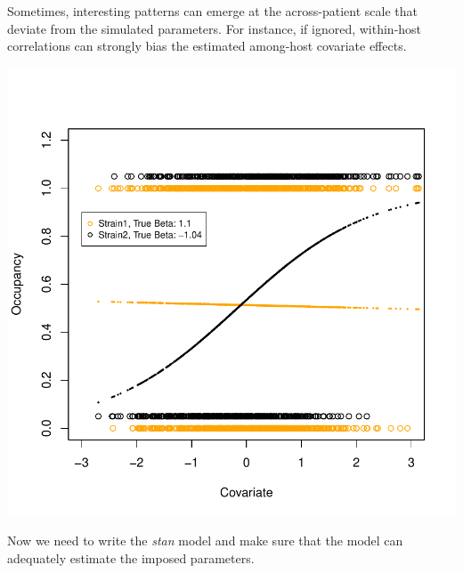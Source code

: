 \documentclass{article}
\begin{document}
Sometimes, interesting patterns can emerge at the across-patient scale that deviate from the simulated parameters. For instance, if ignored, within-host correlations can strongly bias the estimated among-host covariate effects.
\begin{center}
\includegraphics{ReadMe-009}
\end{center}

Now we need to write the \emph{stan} model and make sure that the model can adequately estimate the imposed parameters. 
\end{document}
